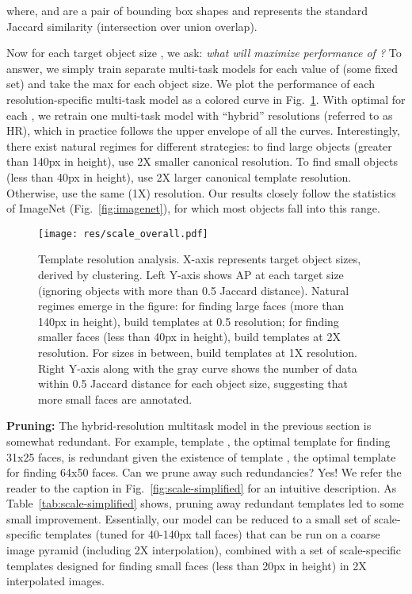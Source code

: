 \documentclass[10pt,twocolumn,letterpaper]{article}
\begin{document}
where,  and  are a pair of bounding
box shapes and  represents the standard Jaccard similarity (intersection over union overlap).

Now for each target object size , we ask:
{\it what  will maximize performance of
  ?} To answer, we simply train separate multi-task models for each value of  (some fixed set) and take the max for each object size. We plot the performance of each resolution-specific multi-task model as a colored curve in Fig.~\ref{fig:scale-overall}. With optimal  for each , we retrain one multi-task model with ``hybrid'' resolutions (referred to as HR), which in practice follows the upper envelope of all the curves. Interestingly, there exist natural regimes for different strategies: to find large objects (greater than 140px in height),  use 2X smaller canonical resolution. To find small objects (less than 40px in height), use 2X larger canonical template resolution. Otherwise, use the same (1X) resolution. Our results closely follow the statistics of ImageNet (Fig.~\ref{fig:imagenet}), for which most objects fall into this range.


\begin{figure}[t]
  \centering
  \texttt{[image: res/scale\_overall.pdf]}
  \caption{Template resolution analysis. X-axis represents target object sizes, derived by clustering. Left Y-axis shows AP at each target size (ignoring objects with more than 0.5 Jaccard distance). Natural regimes emerge in the figure: for finding large faces (more than 140px in height), build templates at 0.5 resolution; for finding smaller faces (less than 40px in height), build templates at 2X resolution. For sizes in between, build templates at 1X resolution. Right Y-axis along with the gray curve shows the number of data within 0.5 Jaccard distance for each object size, suggesting that more small faces are annotated. }
\label{fig:scale-overall}
\end{figure}










{\bf Pruning:} The hybrid-resolution multitask model in the previous section is somewhat redundant. For example, template , the optimal template for finding 31x25 faces, is redundant given the existence of template , the optimal template for finding 64x50 faces.
Can we prune away such redundancies? Yes! We refer the reader to the caption in Fig.~\ref{fig:scale-simplified} for an intuitive description. As Table~\ref{tab:scale-simplified} shows, pruning away redundant templates led to some small improvement. Essentially, our model can be reduced to a small set of scale-specific templates (tuned for 40-140px tall faces) that can be run on a coarse image pyramid (including 2X interpolation), combined with a set of scale-specific templates designed for finding small faces (less than 20px in height) in 2X interpolated images.
\end{document}
